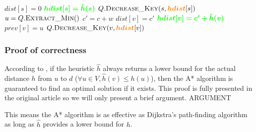 \begin{center}
\begin{algorithm}[H]
\begin{minipage}[t]{0.49\linewidth}
\begin{algorithmic}[1]
                    \State $dist[s] = 0$
                    \State $\textcolor{green}{\bm{hdist[s] = \hat{h}(s)}}$
                    \State $Q.\Call{Decrease\_Key}{s, \textcolor{orange}{\bm{hdist}}[s]}$
                        \State $u = Q.\Call{Extract\_Min}{ }$
                            \State $c' = c + w$
                                \State $dist[v] = c'$
                                \State $\textcolor{green}{\bm{hdist[v] = c'+\hat{h}(v)}}$
                                \State $prev[v] = u$
                                \State $Q.\Call{Decrease\_Key}{v, \textcolor{orange}{\bm{hdist}}[v]}$
                            \EndIf
                        \EndFor
                    \EndWhile
                    \State {}
                \EndFunction
            \end{algorithmic}
        \end{minipage}
    \end{algorithm}
\end{center}
\subsubsection{Proof of correctness}
According to \cite{Astar}, if the heuristic $\hat{h}$ always returns a lower bound for the actual distance $h$ from $u$ to $d$ ($\forall u \in V, \hat{h}(v) \leq h(u)$), then the A* algorithm is guaranteed to find an optimal solution if it exists. This proof is fully presented in the original article so we will only present a brief argument. ARGUMENT\par
This means the A* algorithm is as effective as Dijkstra's path-finding algorithm as long as $\hat{h}$ provides a lower bound for $h$.
